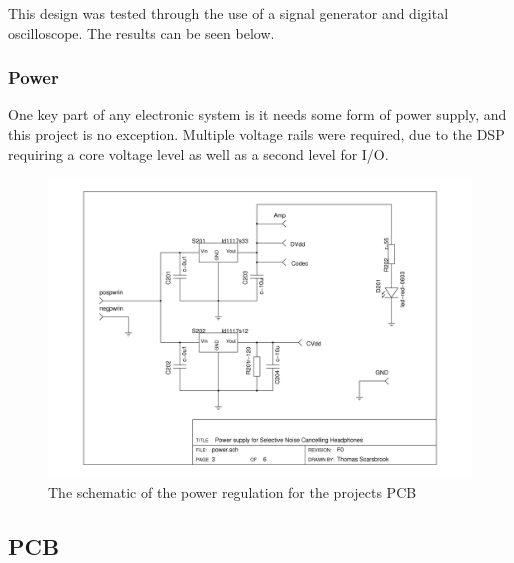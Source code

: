 \noindent This design was tested through the use of a signal generator and digital oscilloscope.
The results can be seen below.

\subsubsection{Power}
One key part of any electronic system is it needs some form of power supply, and this project is no exception.
Multiple voltage rails were required, due to the DSP requiring a core voltage level as well as a second level for I/O.

\begin{figure}[H]
	\centering
	\includegraphics[width=\textwidth]{./img/power.png}
	\caption{The schematic of the power regulation for the projects PCB}
	\label{fig:powersch}
\end{figure}

\subsection{PCB}
